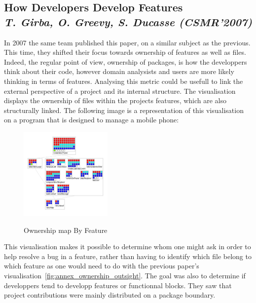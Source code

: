 \subsection{How Developers Develop Features\\ \textit{T. Girba, O. Greevy, S. Ducasse (CSMR'2007)}}

In 2007 the same team published this paper\cite{Girba2007}, on a similar subject as the previous. This time, they shifted their focus towards ownership of features as well as files. Indeed, the regular point of view, ownership of packages, is how the developpers think about their code, however domain analysists and users are more likely thinking in terms of features. Analysing this metric could be usefull to link the external perspective of a project and its internal structure.
The visualisation displays the ownership of files within the projects features, which are also structurally linked. The following image is a representation of this visualisation on a program that is designed to manage a mobile phone:

\begin{figure}[H]
\centering
\includegraphics[width=0.4\textwidth]{./resources/girba2007.png}~
\caption{Ownership map By Feature}
\label{fig:ownership_map_by_feature}
\end{figure}

This visualisation makes it possible to determine whom one might ask in order to help resolve a bug in a feature, rather than having to identify which file belong to which feature as one would need to do with the previous paper's visualisation~\ref{fig:annex_ownership_outsight}.
The goal was also to determine if developpers tend to developp features or functionnal blocks. They saw that project contributions were mainly distributed on a package boundary.
